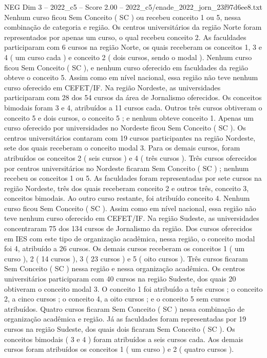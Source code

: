 \begin{textsample}{NEG Dim 3 – 2022\_c5 – Score 2.00 – 2022\_c5/enade\_2022\_jorn\_23f97d6ee8.txt}
Nenhum curso ficou Sem Conceito ( SC ) ou recebeu conceito 1 ou 5, nessa combinação de categoria e região.
Os centros universitários da região Norte foram representados por apenas um curso, o qual recebeu conceito 2.
As faculdades participaram com 6 cursos na região Norte, os quais receberam os conceitos 1, 3 e 4 ( um curso cada ) e conceito 2 ( dois cursos, sendo o modal ).
Nenhum curso ficou Sem Conceito ( SC ), e nenhum curso oferecido em faculdades da região obteve o conceito 5.
Assim como em nível nacional, essa região não teve nenhum curso oferecido em CEFET/IF.
Na região Nordeste, as universidades participaram com 28 dos 54 cursos da área de Jornalismo oferecidos.
Os conceitos bimodais foram 3 e 4, atribuídos a 11 cursos cada.
Outros três cursos obtiveram o conceito 5 e dois cursos, o conceito 5 ; e nenhum obteve conceito 1.
Apenas um curso oferecido por universidades no Nordeste ficou Sem Conceito ( SC ).
Os centros universitários contaram com 19 cursos participantes na região Nordeste, sete dos quais receberam o conceito modal 3.
Para os demais cursos, foram atribuídos os conceitos 2 ( seis cursos ) e 4 ( três cursos ).
Três cursos oferecidos por centros universitários no Nordeste ficaram Sem Conceito ( SC ) ; nenhum recebeu os conceitos 1 ou 5.
As faculdades foram representadas por sete cursos na região Nordeste, três dos quais receberam conceito 2 e outros três, conceito 3, conceitos bimodais.
Ao outro curso restante, foi atribuído conceito 4.
Nenhum curso ficou Sem Conceito ( SC ).
Assim como em nível nacional, essa região não teve nenhum curso oferecido em CEFET/IF.
Na região Sudeste, as universidades concentraram 75 dos 134 cursos de Jornalismo da região.
Dos cursos oferecidos em IES com este tipo de organização acadêmica, nessa região, o conceito modal foi 4, atribuído a 26 cursos.
Os demais cursos receberam os conceitos 1 ( um curso ), 2 ( 14 cursos ), 3 ( 23 cursos ) e 5 ( oito cursos ).
Três cursos ficaram Sem Conceito ( SC ) nessa região e nessa organização acadêmica.
Os centros universitários participaram com 40 cursos na região Sudeste, dos quais 20 obtiveram o conceito modal 3.
O conceito 1 foi atribuído a três cursos ; o conceito 2, a cinco cursos ; o conceito 4, a oito cursos ; e o conceito 5 sem cursos atribuídos.
Quatro cursos ficaram Sem Conceito ( SC ) nessa combinação de organização acadêmica e região.
Já as faculdades foram representadas por 19 cursos na região Sudeste, dos quais dois ficaram Sem Conceito ( SC ).
Os conceitos bimodais ( 3 e 4 ) foram atribuídos a seis cursos cada.
Aos demais cursos foram atribuídos os conceitos 1 ( um curso ) e 2 ( quatro cursos ).

\end{textsample}
